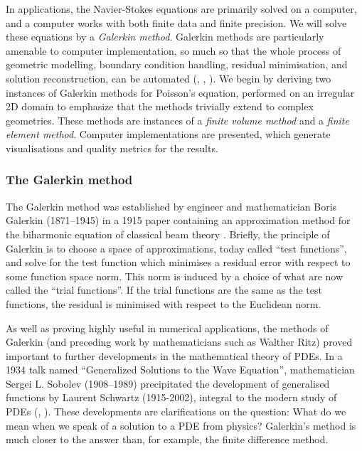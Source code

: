 In applications, the Navier-Stokes equations are primarily
solved on a computer, and a computer works with both finite data and finite precision. We will solve these equations by a \textit{Galerkin method}.
Galerkin methods
are particularly amenable to computer implementation, so much so that the whole process of geometric modelling, boundary condition handling,
residual minimisation, and solution reconstruction, can be automated (\cite{firedrake}, \cite{fenics_book}, \cite{DOLFIN}). We begin by
deriving two instances of Galerkin methods for Poisson's equation, performed on an irregular 2D domain to emphasize that the methods trivially extend
to complex geometries.
These methods are instances of a \textit{finite volume method} and a \textit{finite element method}.
Computer implementations are presented, which generate visualisations and quality metrics for the results.



\subsubsection{The Galerkin method}
The Galerkin method was established by engineer and mathematician Boris Galerkin (1871--1945) in a 1915 paper containing
an approximation method for the biharmonic equation of classical beam theory \cite{boris_galerkin}. Briefly, the principle of Galerkin is to
choose a space of approximations, today called ``test functions'', and solve for the test function which minimises a residual error with respect
to some function space norm. This norm is induced by a choice of what are now called the ``trial functions''. If the trial functions are the same as the test functions,
the residual is minimised with respect to the Euclidean norm.

As well as proving highly useful
in numerical applications, the methods of Galerkin (and preceding work by mathematicians such as Walther Ritz) proved important to further developments
in the mathematical theory of PDEs. In a 1934 talk named ``Generalized Solutions to the Wave Equation'', mathematician Sergei L. Sobolev (1908--1989)
precipitated the development
of generalised functions by Laurent Schwartz (1915-2002), integral to the modern study of PDEs
(\cite{sobolev_web_page}, \cite{one_hundred_years_galerkin}).
These developments are clarifications on the question: What do we mean when we speak of a solution to a PDE from physics? Galerkin's method
is much closer to the answer than, for example, the finite difference method.

